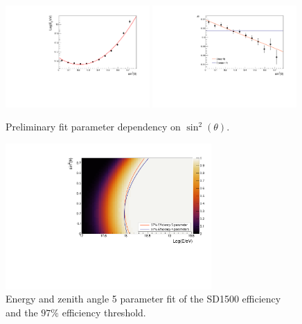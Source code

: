 \documentclass[12pt,a4paper]{article}
\begin{document}
\begin{figure}[h]
    \begin{center}
        \includegraphics[width=0.49\textwidth]{plots/E0New.pdf}
        \includegraphics[width=0.49\textwidth]{plots/bNew.pdf}
        \caption{Preliminary fit parameter dependency on $\sin^2(\theta)$.
        \label{fig:parametersNew}}
    \end{center}
\end{figure} 

\begin{figure}[h]
    \begin{center}
        \includegraphics[width=0.7\textwidth]{plots/SurfaceNew.pdf}
        \caption{Energy and zenith angle 5 parameter fit of the SD1500 efficiency and the $97\%$ efficiency threshold.
        \label{fig:surfaceNew}}
    \end{center}
\end{figure}


\begin{thebibliography}{99}

\end{thebibliography} 
\end{document}
